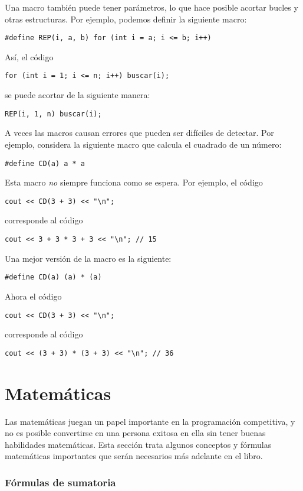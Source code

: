 Una macro también puede tener parámetros,
lo que hace posible acortar bucles y otras
estructuras.
Por ejemplo, podemos definir la siguiente macro:
\begin{lstlisting}
#define REP(i, a, b) for (int i = a; i <= b; i++)
\end{lstlisting}
Así, el código
\begin{lstlisting}
for (int i = 1; i <= n; i++) buscar(i);
\end{lstlisting}
se puede acortar de la siguiente manera:
\begin{lstlisting}
REP(i, 1, n) buscar(i);
\end{lstlisting}

A veces las macros causan errores que pueden ser difíciles
de detectar. Por ejemplo, considera la siguiente macro
que calcula el cuadrado de un número:
\begin{lstlisting}
#define CD(a) a * a
\end{lstlisting}
Esta macro \emph{no} siempre funciona como se espera.
Por ejemplo, el código
\begin{lstlisting}
cout << CD(3 + 3) << "\n";
\end{lstlisting}
corresponde al código
\begin{lstlisting}
cout << 3 + 3 * 3 + 3 << "\n"; // 15
\end{lstlisting}

Una mejor versión de la macro es la siguiente:
\begin{lstlisting}
#define CD(a) (a) * (a)
\end{lstlisting}
Ahora el código
\begin{lstlisting}
cout << CD(3 + 3) << "\n";
\end{lstlisting}
corresponde al código
\begin{lstlisting}
cout << (3 + 3) * (3 + 3) << "\n"; // 36
\end{lstlisting}

\section{Matemáticas}

Las matemáticas juegan un papel importante en la
programación competitiva, y no es posible convertirse
en una persona exitosa en ella sin
tener buenas habilidades matemáticas.
Esta sección trata algunos conceptos y fórmulas
matemáticas importantes que
serán necesarios más adelante en el libro.

\subsubsection{Fórmulas de sumatoria}


